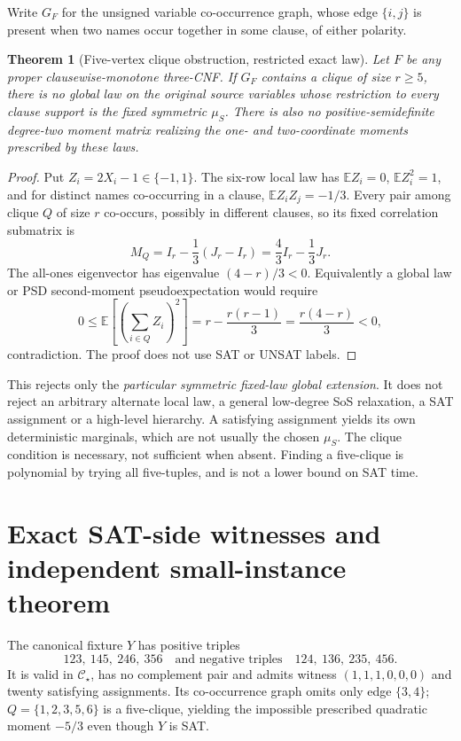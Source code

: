 \documentclass[11pt]{article}
\newtheorem{theorem}{Theorem}
\newcommand{\CS}{\mathcal C_\star}
\begin{document}
Write $G_F$ for the unsigned variable co-occurrence graph, whose edge $\{i,j\}$ is present when two names occur together in some clause, of either polarity.

\begin{theorem}[Five-vertex clique obstruction, restricted exact law]
Let $F$ be any proper clausewise-monotone three-CNF. If $G_F$ contains a clique of size $r\ge5$, there is no global law on the original source variables whose restriction to \emph{every} clause support is the fixed symmetric $\mu_S$. There is also no positive-semidefinite degree-two moment matrix realizing the one- and two-coordinate moments prescribed by these laws.
\end{theorem}
\begin{proof}
Put $Z_i=2X_i-1\in\{-1,1\}$. The six-row local law has $\mathbb E Z_i=0$, $\mathbb E Z_i^2=1$, and for distinct names co-occurring in a clause, $\mathbb E Z_iZ_j=-1/3$. Every pair among clique $Q$ of size $r$ co-occurs, possibly in different clauses, so its fixed correlation submatrix is
\[
M_Q=I_r-\frac13(J_r-I_r)=\frac43I_r-\frac13J_r.
\]
The all-ones eigenvector has eigenvalue $(4-r)/3<0$. Equivalently a global law or PSD second-moment pseudoexpectation would require
\[
0\le\mathbb E\left[\left(\sum_{i\in Q}Z_i\right)^2\right]
=r-\frac{r(r-1)}3
=\boxed{\frac{r(4-r)}3}<0,
\]
contradiction. The proof does not use SAT or UNSAT labels.
\end{proof}

This rejects only the \emph{particular symmetric fixed-law global extension}. It does not reject an arbitrary alternate local law, a general low-degree SoS relaxation, a SAT assignment or a high-level hierarchy. A satisfying assignment yields its own deterministic marginals, which are not usually the chosen $\mu_S$. The clique condition is necessary, not sufficient when absent. Finding a five-clique is polynomial by trying all five-tuples, and is not a lower bound on SAT time.

\section{Exact SAT-side witnesses and independent small-instance theorem}
The canonical fixture $Y$ has positive triples
\[
123,\ 145,\ 246,\ 356
\quad\text{and negative triples}\quad
124,\ 136,\ 235,\ 456.
\]
It is valid in $\CS$, has no complement pair and admits witness $(1,1,1,0,0,0)$ and twenty satisfying assignments. Its co-occurrence graph omits only edge $\{3,4\}$; $Q=\{1,2,3,5,6\}$ is a five-clique, yielding the impossible prescribed quadratic moment $-5/3$ even though $Y$ is SAT.
\end{document}
